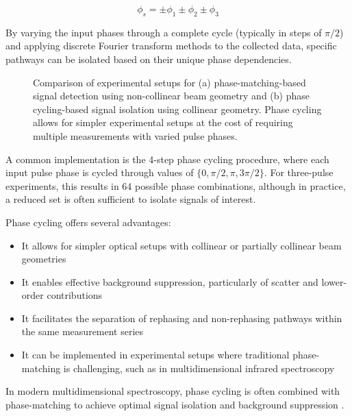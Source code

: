 \begin{equation}
    \phi_s = \pm\phi_1 \pm\phi_2 \pm\phi_3
    \label{eq:phase_cycling}
\end{equation}

\noindent By varying the input phases through a complete cycle (typically in steps of $\pi/2$) and applying discrete Fourier transform methods to the collected data, specific pathways can be isolated based on their unique phase dependencies.

\begin{figure}[ht]
    \centering
    \caption{Comparison of experimental setups for (a) phase-matching-based signal detection using non-collinear beam geometry and (b) phase cycling-based signal isolation using collinear geometry. Phase cycling allows for simpler experimental setups at the cost of requiring multiple measurements with varied pulse phases.}
    \label{fig:phase_cycling_vs_matching}
\end{figure}

\noindent A common implementation is the 4-step phase cycling procedure, where each input pulse phase is cycled through values of $\{0, \pi/2, \pi, 3\pi/2\}$. For three-pulse experiments, this results in 64 possible phase combinations, although in practice, a reduced set is often sufficient to isolate signals of interest.

\noindent Phase cycling offers several advantages:

\begin{itemize}
    \item It allows for simpler optical setups with collinear or partially collinear beam geometries
    \item It enables effective background suppression, particularly of scatter and lower-order contributions
    \item It facilitates the separation of rephasing and non-rephasing pathways within the same measurement series
    \item It can be implemented in experimental setups where traditional phase-matching is challenging, such as in multidimensional infrared spectroscopy
\end{itemize}

\noindent In modern multidimensional spectroscopy, phase cycling is often combined with phase-matching to achieve optimal signal isolation and background suppression \cite{Tan2008, Tian2003}.

